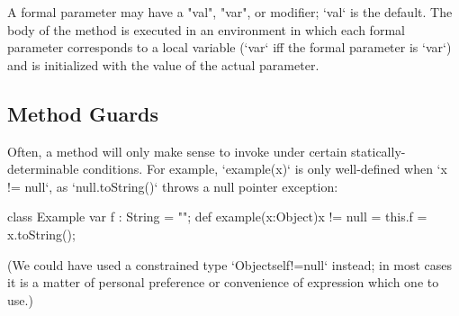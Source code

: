 
A formal parameter may have a \xcd"val", \xcd"var", or 
modifier; \xcd`val` is the default.
The body of the method is executed in an environment in which 
each formal parameter corresponds to a local variable (\xcd`var` iff the
formal parameter is \xcd`var`)
and is initialized with the value of the actual parameter.

\subsection{Method Guards}
\label{MethodGuard}

Often, a method will only make sense to invoke under certain
statically-determinable conditions.  For example, \xcd`example(x)` is only
well-defined when \xcd`x != null`, as \xcd`null.toString()` throws a null
pointer exception: 
\begin{xten}
class Example {
   var f : String = "";
   def example(x:Object){x != null} = {
      this.f = x.toString();
   }
}
\end{xten}
%
\noindent
(We could have used a constrained type \xcd`Object{self!=null}` instead; in
most cases it is a matter of personal preference or convenience of expression
which one to use.) 

